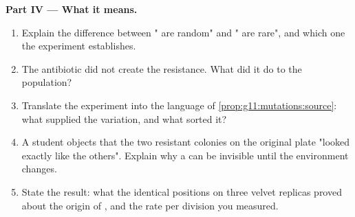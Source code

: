 \begin{problem}
\medskip
\noindent\textbf{Part IV --- What it means.}
\begin{enumerate}[resume]
  \item Explain the difference between " are random" and
        " are rare", and which one the experiment
        establishes.
  \item The antibiotic did not create the resistance. What did it do
        to the population?
  \item Translate the experiment into the language of
        \cref{prop:g11:mutations:source}: what supplied the variation,
        and what sorted it?
  \item A student objects that the two resistant colonies on the
        original plate "looked exactly like the others". Explain why
        a  can be invisible until the environment changes.
  \item State the result: what the identical positions on three
        velvet replicas proved about the origin of , and the
        rate per division you measured.
\end{enumerate}
\end{problem}
